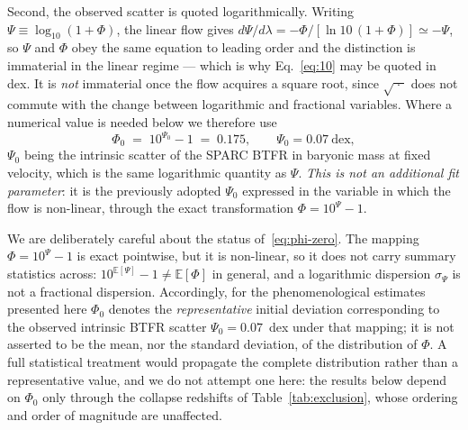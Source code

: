 \documentclass[11pt]{article}
\theoremstyle{plain}
\begin{document}
Second, the observed scatter is quoted logarithmically. Writing
$\Psi\equiv\log_{10}(1+\Phi)$, the linear flow gives
$d\Psi/d\lambda=-\Phi/[\ln\!10\,(1+\Phi)]\simeq-\Psi$, so $\Psi$ and $\Phi$
obey the same equation to leading order and the distinction is immaterial in
the linear regime --- which is why Eq.~\eqref{eq:10} may be quoted in dex. It
is \emph{not} immaterial once the flow acquires a square root, since
$\sqrt{\;\cdot\;}$ does not commute with the change between logarithmic and
fractional variables. Where a numerical value is needed below we therefore use
\begin{equation*}\tag{12}\label{eq:phi-zero}
\Phi_{0} \;=\; 10^{\Psi_{0}}-1 \;=\; 0.175,
\qquad \Psi_{0}=0.07\ \text{dex},
\end{equation*}
$\Psi_{0}$ being the intrinsic scatter of the SPARC BTFR in baryonic mass at
fixed velocity, which is the same logarithmic quantity as $\Psi$. \emph{This is
not an additional fit parameter}: it is the previously adopted $\Psi_{0}$
expressed in the variable in which the flow is non-linear, through the exact
transformation $\Phi=10^{\Psi}-1$.

We are deliberately careful about the status of~\eqref{eq:phi-zero}. The mapping
$\Phi=10^{\Psi}-1$ is exact pointwise, but it is non-linear, so it does not
carry summary statistics across: $10^{\mathbb{E}[\Psi]}-1\neq\mathbb{E}[\Phi]$
in general, and a logarithmic dispersion $\sigma_{\Psi}$ is not a fractional
dispersion. Accordingly, for the phenomenological estimates presented here
$\Phi_{0}$ denotes the \emph{representative} initial deviation corresponding to
the observed intrinsic BTFR scatter $\Psi_{0}=0.07$~dex under that mapping; it
is not asserted to be the mean, nor the standard deviation, of the distribution
of $\Phi$. A full statistical treatment would propagate the complete
distribution rather than a representative value, and we do not attempt one here:
the results below depend on $\Phi_{0}$ only through the collapse redshifts of
Table~\ref{tab:exclusion}, whose ordering and order of magnitude are unaffected.
\end{document}
